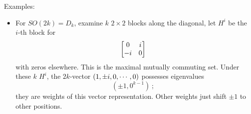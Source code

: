 \noindent Examples:
\begin{itemize}
	\item For $SO(2k)=D_{k}$, examine $k$ $2\times2$ blocks along the diagonal, let $H^{i}$ be the $i$-th block for
	\begin{equation}
		\begin{bmatrix}
			0 & i \\ -i & 0
		\end{bmatrix}  \label{11.4.14}
	\end{equation}
	with zeros elsewhere. This is the maximal mutually commuting set. Under these $k$ $H^{i}$, the $2k$-vector $(1,\pm i,0,\cdots,0)$ possesses eigenvalues
	\begin{equation}
		(\pm 1, 0^{k-1}) \:; \label{11.4.15}
	\end{equation}
	they are weights of this vector representation. Other weights just shift $\pm1$ to other positions.
	

\end{itemize}
